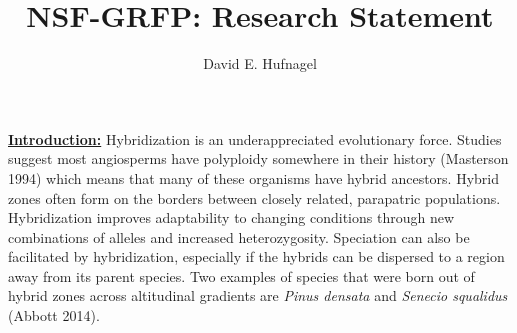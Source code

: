 \documentclass[12pt]{amsart}
\title{NSF-GRFP: Research Statement}
\author{David E. Hufnagel}
\newcommand{\mbh}[1]{\textcolor{red}{ \emph{\scriptsize  #1}} }
\begin{document}
\maketitle

\textbf{\underline{Introduction:} }
Hybridization is an underappreciated evolutionary force.
Studies suggest most angiosperms have polyploidy somewhere in their history (Masterson 1994) which means that many of these organisms have hybrid ancestors. %
Hybrid zones often form on the borders between closely related, parapatric populations. %
Hybridization improves adaptability to changing conditions through new combinations of alleles and increased heterozygosity.
Speciation can also be facilitated by hybridization, especially if the hybrids can be dispersed to a region away from its parent species.
Two examples of species that were born out of hybrid zones across altitudinal gradients are \textit{Pinus densata} and \textit{Senecio squalidus} (Abbott 2014).
\end{document}
